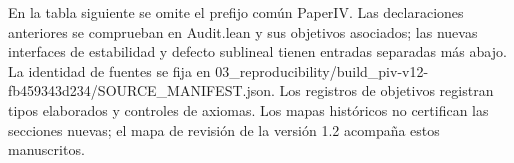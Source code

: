 \documentclass[spanish,11pt,a4paper]{article}
\begin{document}
En la tabla siguiente se omite el prefijo común {\ttfamily\small PaperIV}. Las declaraciones anteriores se comprueban en {\ttfamily\small Audit.\discretionary{\hbox{\ensuremath{\hookrightarrow}}}{}{}lean} y sus objetivos asociados; las nuevas interfaces de estabilidad y defecto sublineal tienen entradas separadas más abajo. La identidad de fuentes se fija en {\ttfamily\small 03\_\discretionary{\hbox{\ensuremath{\hookrightarrow}}}{}{}reproducibil\discretionary{\hbox{\ensuremath{\hookrightarrow}}}{}{}ity/\discretionary{\hbox{\ensuremath{\hookrightarrow}}}{}{}build\_\discretionary{\hbox{\ensuremath{\hookrightarrow}}}{}{}piv-\discretionary{\hbox{\ensuremath{\hookrightarrow}}}{}{}v12-\discretionary{\hbox{\ensuremath{\hookrightarrow}}}{}{}fb459343d234\discretionary{\hbox{\ensuremath{\hookrightarrow}}}{}{}/\discretionary{\hbox{\ensuremath{\hookrightarrow}}}{}{}SOURCE\_\discretionary{\hbox{\ensuremath{\hookrightarrow}}}{}{}MANIFEST.\discretionary{\hbox{\ensuremath{\hookrightarrow}}}{}{}json}. Los registros de objetivos registran tipos elaborados y controles de axiomas. Los mapas históricos no certifican las secciones nuevas; el mapa de revisión de la versión 1.2 acompaña estos manuscritos.
\end{document}
